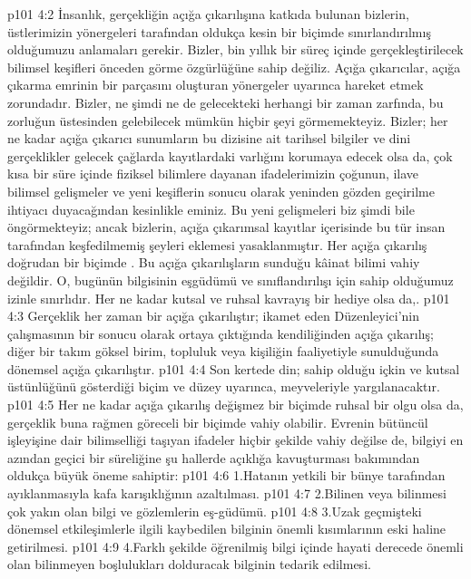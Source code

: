 \vs p101 4:2 İnsanlık, gerçekliğin açığa çıkarılışına katkıda bulunan bizlerin, üstlerimizin yönergeleri tarafından oldukça kesin bir biçimde sınırlandırılmış olduğumuzu anlamaları gerekir. Bizler, bin yıllık bir süreç içinde gerçekleştirilecek bilimsel keşifleri önceden görme özgürlüğüne sahip değiliz. Açığa çıkarıcılar, açığa çıkarma emrinin bir parçasını oluşturan yönergeler uyarınca hareket etmek zorundadır. Bizler, ne şimdi ne de gelecekteki herhangi bir zaman zarfında, bu zorluğun üstesinden gelebilecek mümkün hiçbir şeyi görmemekteyiz. Bizler; her ne kadar açığa çıkarıcı sunumların bu dizisine ait tarihsel bilgiler ve dini gerçeklikler gelecek çağlarda kayıtlardaki varlığını korumaya edecek olsa da, çok kısa bir süre içinde fiziksel bilimlere dayanan ifadelerimizin çoğunun, ilave bilimsel gelişmeler ve yeni keşiflerin sonucu olarak yeninden gözden geçirilme ihtiyacı duyacağından kesinlikle eminiz. Bu yeni gelişmeleri biz şimdi bile öngörmekteyiz; ancak bizlerin, açığa çıkarımsal kayıtlar içerisinde bu tür insan tarafından keşfedilmemiş şeyleri eklemesi yasaklanmıştır. Her açığa çıkarılış doğrudan bir biçimde . Bu açığa çıkarılışların sunduğu kâinat bilimi vahiy değildir. O, bugünün bilgisinin eşgüdümü ve sınıflandırılışı için sahip olduğumuz izinle sınırlıdır. Her ne kadar kutsal ve ruhsal kavrayış bir hediye olsa da,.
\vs p101 4:3 Gerçeklik her zaman bir açığa çıkarılıştır; ikamet eden Düzenleyici’nin çalışmasının bir sonucu olarak ortaya çıktığında kendiliğinden açığa çıkarılış; diğer bir takım göksel birim, topluluk veya kişiliğin faaliyetiyle sunulduğunda dönemsel açığa çıkarılıştır.
\vs p101 4:4 Son kertede din; sahip olduğu içkin ve kutsal üstünlüğünü gösterdiği biçim ve düzey uyarınca, meyveleriyle yargılanacaktır.
\vs p101 4:5 Her ne kadar açığa çıkarılış değişmez bir biçimde ruhsal bir olgu olsa da, gerçeklik buna rağmen göreceli bir biçimde vahiy olabilir. Evrenin bütüncül işleyişine dair bilimselliği taşıyan ifadeler hiçbir şekilde vahiy değilse de, bilgiyi en azından geçici bir süreliğine şu hallerde açıklığa kavuşturması bakımından oldukça büyük öneme sahiptir:
\vs p101 4:6 1.\bibnobreakspace Hatanın yetkili bir bünye tarafından ayıklanmasıyla kafa karışıklığının azaltılması.
\vs p101 4:7 2.\bibnobreakspace Bilinen veya bilinmesi çok yakın olan bilgi ve gözlemlerin eş\hyp{}güdümü.
\vs p101 4:8 3.\bibnobreakspace Uzak geçmişteki dönemsel etkileşimlerle ilgili kaybedilen bilginin önemli kısımlarının eski haline getirilmesi.
\vs p101 4:9 4.\bibnobreakspace Farklı şekilde öğrenilmiş bilgi içinde hayati derecede önemli olan bilinmeyen boşlulukları dolduracak bilginin tedarik edilmesi.
